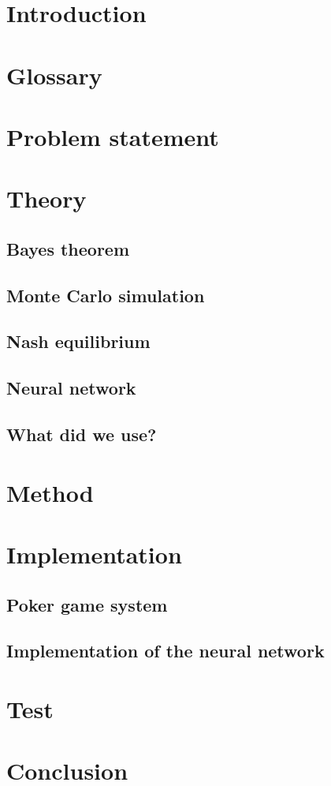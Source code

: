 



\section{Introduction}

\section{Glossary}

\section{Problem statement}

\section{Theory}
\subsection{Bayes theorem}
\subsection{Monte Carlo simulation}
\subsection{Nash equilibrium}

\subsection{Neural network}
\subsection{What did we use?}

\section{Method}

\section{Implementation}
\subsection{Poker game system}
\subsection{Implementation of the neural network}

\section{Test}

\section{Conclusion}


